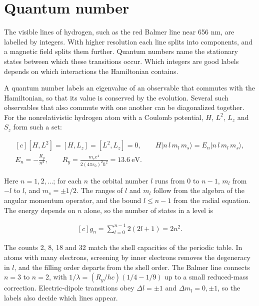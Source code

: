 \documentclass[11pt,oneside]{book}
\newenvironment{centeredalign}{\[\begin{gathered}[c]}{\end{gathered}\]}
\newcommand{\ket}[1]{\lvert #1\rangle}
\begin{document}
\clearpage

\section{Quantum number}

\label{topic:quantum-number}

The visible lines of hydrogen, such as the red Balmer line near 656 nm, are labelled by integers. With higher resolution each line splits into components, and a magnetic field splits them further. Quantum numbers name the stationary states between which these transitions occur. Which integers are good labels depends on which interactions the Hamiltonian contains.

A quantum number labels an eigenvalue of an observable that commutes with the Hamiltonian, so that its value is conserved by the evolution. Several such observables that also commute with one another can be diagonalized together. For the nonrelativistic hydrogen atom with a Coulomb potential, \(H\), \(L^2\), \(L_z\) and \(S_z\) form such a set:

\begin{centeredalign}
[H,L^2]=[H,L_z]=[L^2,L_z]=0,\qquad H\ket{n\,l\,m_l\,m_s}=E_n\ket{n\,l\,m_l\,m_s},\\
E_n=-\frac{R_y}{n^2},\qquad R_y=\frac{m_ee^4}{2(4\pi\varepsilon_0)^2\hbar^2}=13.6\ \mathrm{eV}.
\end{centeredalign}

Here \(n=1,2,\ldots\); for each \(n\) the orbital number \(l\) runs from \(0\) to \(n-1\), \(m_l\) from \(-l\) to \(l\), and \(m_s=\pm1/2\). The ranges of \(l\) and \(m_l\) follow from the algebra of the angular momentum operator, and the bound \(l\leq n-1\) from the radial equation. The energy depends on \(n\) alone, so the number of states in a level is

\begin{centeredalign}
g_n=\sum_{l=0}^{n-1}2(2l+1)=2n^2.
\end{centeredalign}

The counts 2, 8, 18 and 32 match the shell capacities of the periodic table. In atoms with many electrons, screening by inner electrons removes the degeneracy in \(l\), and the filling order departs from the shell order. The Balmer line connects \(n=3\) to \(n=2\), with \(1/\lambda=(R_y/hc)(1/4-1/9)\) up to a small reduced-mass correction. Electric-dipole transitions obey \(\Delta l=\pm1\) and \(\Delta m_l=0,\pm1\), so the labels also decide which lines appear.
\end{document}
